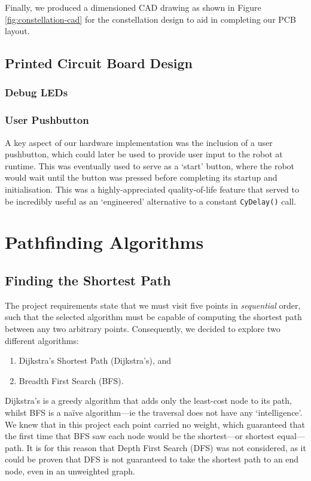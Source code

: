 \documentclass[conference]{IEEEtran}
\begin{document}
Finally, we produced a dimensioned CAD drawing as shown in Figure \ref{fig:constellation-cad} for the constellation design to aid in completing our PCB layout.

\subsection{Printed Circuit Board Design}


\subsubsection{Debug LEDs}



\subsubsection{User Pushbutton}

A key aspect of our hardware implementation was the inclusion of a user pushbutton, which could later be used to provide user input to the robot at runtime.
This was eventually used to serve as a `start' button, where the robot would wait until the button was pressed before completing its startup and initialisation.
This was a highly-appreciated quality-of-life feature that served to be incredibly useful as an `engineered' alternative to a constant \texttt{CyDelay()} call.



\section{Pathfinding Algorithms \label{sect-pathfinding-algorithms}}

\subsection{Finding the Shortest Path}

The project requirements state that we must visit five points in \emph{sequential} order, such that the selected algorithm must be capable of computing the shortest path between any two arbitrary points.
Consequently, we decided to explore two different algorithms:
\begin{enumerate}
	\item Dijkstra's Shortest Path (Dijkstra's), and
	\item Breadth First Search (BFS).
\end{enumerate}
Dijkstra's is a greedy algorithm that adds only the least-cost node to its path, whilst BFS is a naïve algorithm—ie the traversal does not have any `intelligence'.
We knew that in this project each point carried no weight, which guaranteed that the first time that BFS saw each node would be the shortest—or shortest equal—path.
It is for this reason that Depth First Search (DFS) was not considered, as it could be proven that DFS is not guaranteed to take the shortest path to an end node, even in an unweighted graph.
\end{document}
